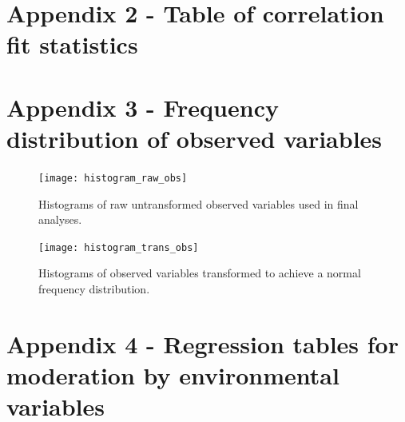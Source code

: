\documentclass[11pt,a4paper]{article}
\begin{document}
\section*{Appendix 2 - Table of correlation fit statistics}



\section*{Appendix 3 - Frequency distribution of observed variables}

\begin{figure}[H]
\centering
	\texttt{[image: histogram\_raw\_obs]}
	\caption{Histograms of raw untransformed observed variables used in final analyses.}
	\label{histogram_raw_obs}
\end{figure}

\begin{figure}[H]
\centering
	\texttt{[image: histogram\_trans\_obs]}
	\caption{Histograms of observed variables transformed to achieve a normal frequency distribution.}
	\label{histogram_trans_obs}
\end{figure}

\section*{Appendix 4 - Regression tables for moderation by environmental variables}




\end{document}
